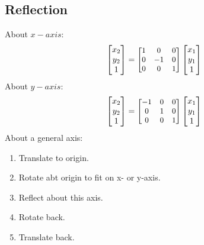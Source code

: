 \subsection{Reflection}
About $x-axis$:
\[\begin{bmatrix}
  x_2\\
  y_2\\
  1
\end{bmatrix}=
{\small
\begin{bmatrix}
  1 & 0 & 0\\
  0 & -1 & 0\\
  0 & 0 & 1
\end{bmatrix}
}
\begin{bmatrix}
  x_1\\
  y_1\\
  1
\end{bmatrix}
\]
About $y-axis$:
\[\begin{bmatrix}
  x_2\\
  y_2\\
  1
\end{bmatrix}=
{\small\begin{bmatrix}
  -1 & 0 & 0\\
  0 & 1 & 0\\
  0 & 0 & 1
\end{bmatrix}
}
\begin{bmatrix}
  x_1\\
  y_1\\
  1
\end{bmatrix}
\]
About a general axis:
\begin{enumerate}
  \item Translate to origin.
  \item Rotate abt origin to fit on x- or y-axis.
  \item Reflect about this axis.
  \item Rotate back.
  \item Translate back.
\end{enumerate}
